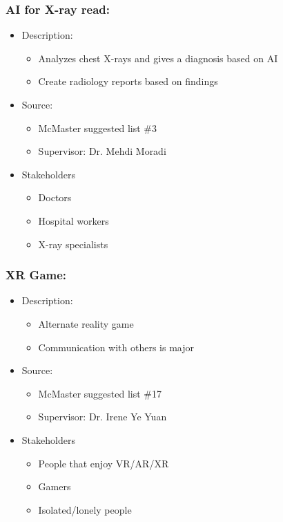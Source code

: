\documentclass{article}
\begin{document}
\subsubsection*{AI for X-ray read:}
\label{subsec:xray}
\begin{itemize}
    \item Description:
    \begin{itemize}
        \item Analyzes chest X-rays and gives a diagnosis based on AI 
        \item Create radiology reports based on findings
    \end{itemize}
    \item Source:
    \begin{itemize}
        \item McMaster suggested list \#3
        \item Supervisor: Dr. Mehdi Moradi
    \end{itemize}
    \item Stakeholders
    \begin{itemize}
        \item Doctors
        \item Hospital workers
        \item X-ray specialists 
    \end{itemize}
\end{itemize}

\subsubsection*{XR Game:}
\label{subsec:xrgame}
\begin{itemize}
    \item Description:
    \begin{itemize}
        \item Alternate reality game
        \item Communication with others is major
    \end{itemize}
    \item Source:
    \begin{itemize}
        \item McMaster suggested list \#17
        \item Supervisor: Dr. Irene Ye Yuan
    \end{itemize}
    \item Stakeholders
    \begin{itemize}
        \item People that enjoy VR/AR/XR
        \item Gamers
        \item Isolated/lonely people
    \end{itemize}
\end{itemize}
\end{document}
